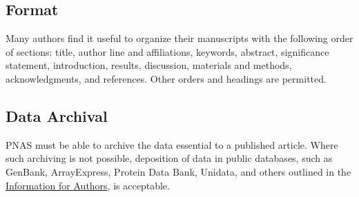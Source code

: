 \documentclass[9pt,twocolumn,twoside]{pnas-new}
\begin{document}
\subsection*{Format}

Many authors find it useful to organize their manuscripts with the following order of sections: title, author line and affiliations, keywords, abstract, significance statement, introduction, results, discussion, materials and methods, acknowledgments, and references. Other orders and headings are permitted.





\subsection*{Data Archival}

PNAS must be able to archive the data essential to a published article. Where such archiving is not possible, deposition of data in public databases, such as GenBank, ArrayExpress, Protein Data Bank, Unidata, and others outlined in the \href{https://www.pnas.org/author-center/editorial-and-journal-policies#materials-and-data-availability}{Information for Authors}, is acceptable.
\end{document}

